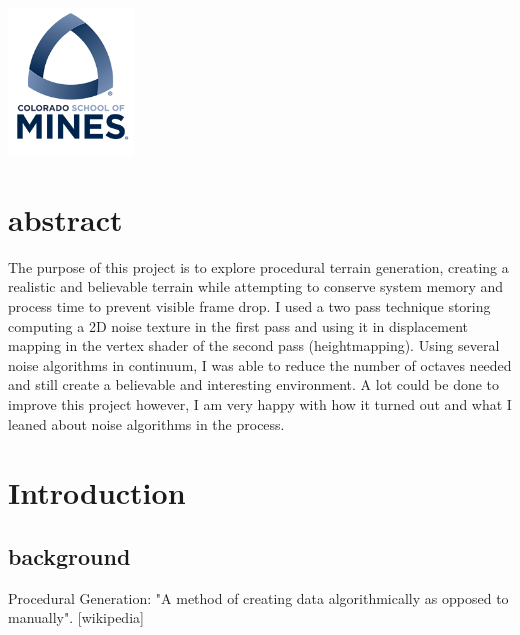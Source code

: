 \documentclass[12pt]{article}
\begin{document}
\begin{titlepage}
\newcommand*{\plogo}{\includegraphics[width=0.25\textwidth]{../project_proposal/imgs/mines.png}}

\plogo\\[1cm] %
 

\vfill %
\end{titlepage}

\newpage

\section{abstract}
    The purpose of this project is to explore procedural terrain generation, creating a realistic and believable terrain 
    while attempting to conserve system memory and process time to prevent visible frame drop. I used a two pass technique
    storing computing a 2D noise texture in the first pass and using it in displacement mapping in the vertex shader of the
    second pass (heightmapping). Using several noise algorithms in continuum, I was able to reduce the number of octaves
    needed and still create a believable and interesting environment. A lot could be done to improve this project however,
    I am very happy with how it turned out and what I leaned about noise algorithms in the process.

\newpage

\tableofcontents

\section{Introduction}
    \subsection{background}
        Procedural Generation: "A method of creating data algorithmically as opposed to manually". [wikipedia]
\end{document}
